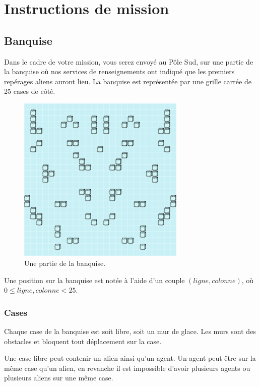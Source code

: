 \section{Instructions de mission}\label{instructions-de-mission}

\subsection{Banquise}\label{banquise}

Dans le cadre de votre mission, vous serez envoyé au Pôle Sud, sur une
partie de la banquise où nos services de renseignements ont indiqué que
les premiers repérages aliens auront lieu. La banquise est représentée
par une grille carrée de 25 cases de côté.

\begin{figure}[!h]
    \centering
    \includegraphics[width=8cm]{img/map.png}
    \caption*{Une partie de la banquise.}
\end{figure}

Une position sur la banquise est notée à l'aide d'un couple $(ligne,
colonne)$, où $0 \leq ligne, colonne < 25$.

\subsubsection{Cases}\label{cases}

Chaque case de la banquise est soit libre, soit un mur de glace. Les
murs sont des obstacles et bloquent tout déplacement sur la case.

Une case libre peut contenir un alien ainsi qu'un agent. Un agent peut
être sur la même case qu'un alien, en revanche il est impossible d'avoir
plusieurs agents ou plusieurs aliens sur une même case.

